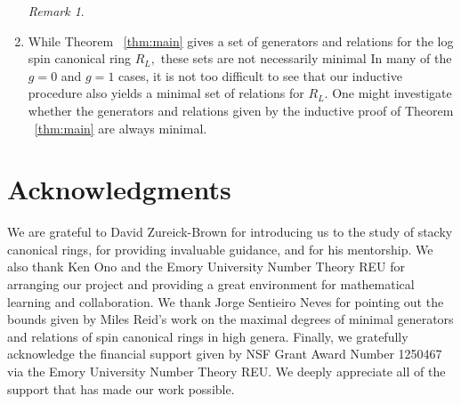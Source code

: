 \documentclass{amsart}
\theoremstyle{plain}
\theoremstyle{definition}
\theoremstyle{remark}
\newtheorem{rem}[thm]{Remark}
\numberwithin{equation}{section}
\newcommand{\halfcan}{L}
\begin{document}
\begin{enumerate}
\begin{rem}
			\end{rem}
	\item While Theorem ~\ref{thm:main} gives a set of 
		generators and relations
		for the log spin canonical ring $R_\halfcan,$ these sets are not necessarily minimal
		In many of the $g = 0$ and $g=1$ cases, 
		it is not too difficult to see that our inductive procedure also 
		yields a minimal set of relations for $R_\halfcan$. One might investigate 
		whether the generators and relations given by the inductive proof 
		of Theorem ~\ref{thm:main} are always minimal.
		\end{enumerate}


\section{Acknowledgments}
We are grateful to David Zureick-Brown for introducing us to the
study of stacky canonical rings, for providing invaluable guidance,
and for his mentorship. We also thank Ken Ono and the
Emory University Number Theory REU for arranging our project and
providing a great environment for mathematical learning and
collaboration. We thank Jorge Sentieiro Neves for pointing out the
bounds given by Miles Reid's work on the maximal degrees of minimal
generators and relations of spin canonical rings in high genera.
Finally, we gratefully acknowledge the financial support given by
NSF Grant Award Number 1250467 via the Emory University Number
Theory REU. We deeply appreciate all of the support that has made
our work possible.


\nocite{*}
{}

\end{document}
